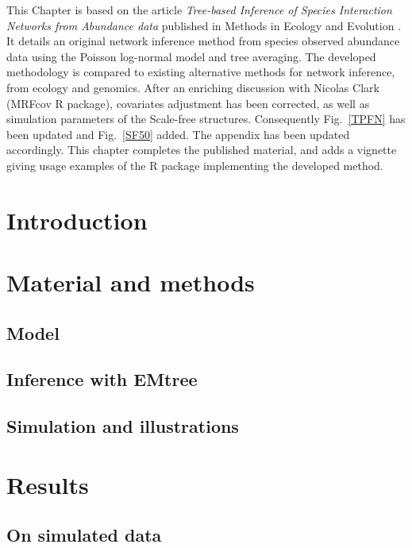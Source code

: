
\vspace{1cm}
This Chapter is based on the article \textit{Tree-based Inference of Species Interaction Networks from Abundance data} published in Methods in Ecology and Evolution \citep{MRA20}. It details an original network inference method from species observed abundance data using the Poisson log-normal model and tree averaging. The developed methodology is compared to existing alternative methods for network inference, from ecology and genomics. After an enriching discussion with Nicolas Clark (MRFcov R package), covariates adjustment has been corrected, as well as simulation parameters of the Scale-free structures. Consequently Fig.~\ref{TPFN} has been updated and Fig.~\ref{SF50}  added. The appendix has been updated accordingly. This chapter completes the published material, and adds a vignette giving usage examples of the R package implementing the developed method.


\section{Introduction}

%

\section{Material and methods}
\subsection{Model} \label{sec:model} 
\subsection{Inference with EMtree} \label{sec:inference} 
\subsection{Simulation and illustrations} 
 
\section{Results}
\subsection{On simulated data}  \label{sec:simul}
